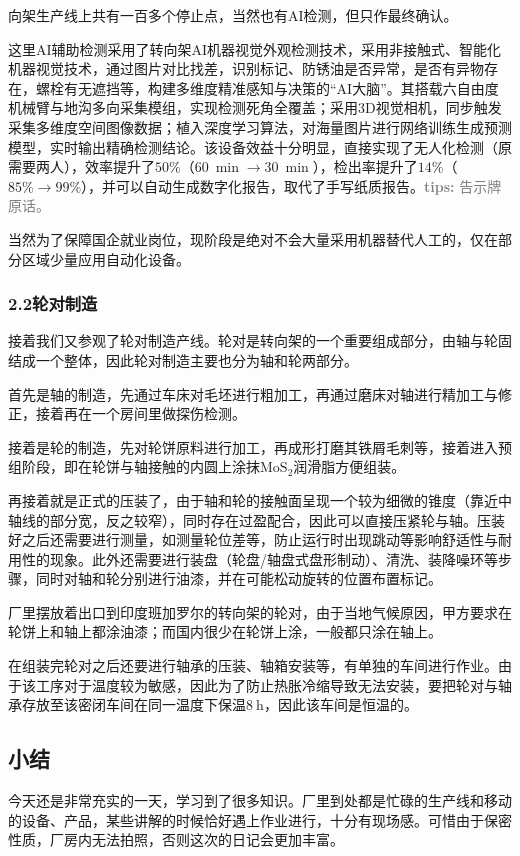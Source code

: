 \documentclass[12pt, oneside, a4paper]{ctexart}
\begin{document}
\newpage
\journalpage\par\noindent
向架生产线上共有一百多个停止点，当然也有AI检测，但只作最终确认。\par{}
这里AI辅助检测采用了转向架AI机器视觉外观检测技术，采用非接触式、智能化机器视觉技术，通过图片对比找差，识别标记、防锈油是否异常，是否有异物存在，螺栓有无遮挡等，构建多维度精准感知与决策的“AI大脑”。其搭载六自由度机械臂与地沟多向采集模组，实现检测死角全覆盖；采用3D视觉相机，同步触发采集多维度空间图像数据；植入深度学习算法，对海量图片进行网络训练生成预测模型，实时输出精确检测结论。该设备效益十分明显，直接实现了无人化检测（原需要两人），效率提升了$50\%$（$60~\min\to30~\min$），检出率提升了$14\%$（$85\%\to99\%$），并可以自动生成数字化报告，取代了手写纸质报告。\textcolor{gray}{{\bf{}tips: }告示牌原话。}\par{}
当然为了保障国企就业岗位，现阶段是绝对不会大量采用机器替代人工的，仅在部分区域少量应用自动化设备。\par{}
\vspace{-5mm}\subsubsection*{2.2\quad{}轮对制造}\vspace{-2mm}
接着我们又参观了轮对制造产线。轮对是转向架的一个重要组成部分，由轴与轮固结成一个整体，因此轮对制造主要也分为轴和轮两部分。\par{}
首先是轴的制造，先通过车床对毛坯进行粗加工，再通过磨床对轴进行精加工与修正，接着再在一个房间里做探伤检测。\par{}
接着是轮的制造，先对轮饼原料进行加工，再成形打磨其铁屑毛刺等，接着进入预组阶段，即在轮饼与轴接触的内圆上涂抹$\mathrm{MoS_2}$润滑脂方便组装。\par{}
再接着就是正式的压装了，由于轴和轮的接触面呈现一个较为细微的锥度（靠近中轴线的部分宽，反之较窄），同时存在过盈配合，因此可以直接压紧轮与轴。压装好之后还需要进行测量，如测量轮位差等，防止运行时出现跳动等影响舒适性与耐用性的现象。此外还需要进行装盘（轮盘/轴盘式盘形制动）、清洗、装降噪环等步骤，同时对轴和轮分别进行油漆，并在可能松动旋转的位置布置标记。\par{}
厂里摆放着出口到印度班加罗尔的转向架的轮对，由于当地气候原因，甲方要求在轮饼上和轴上都涂油漆；而国内很少在轮饼上涂，一般都只涂在轴上。\par{}
在组装完轮对之后还要进行轴承的压装、轴箱安装等，有单独的车间进行作业。由于该工序对于温度较为敏感，因此为了防止热胀冷缩导致无法安装，要把轮对与轴承存放至该密闭车间在同一温度下保温$8~\mathrm{h}$，因此该车间是恒温的。\par{}
\vspace{-5mm}\subsection*{小结}\vspace{-2mm}
今天还是非常充实的一天，学习到了很多知识。厂里到处都是忙碌的生产线和移动的设备、产品，某些讲解的时候恰好遇上作业进行，十分有现场感。可惜由于保密性质，厂房内无法拍照，否则这次的日记会更加丰富。\par{}
\end{document}
